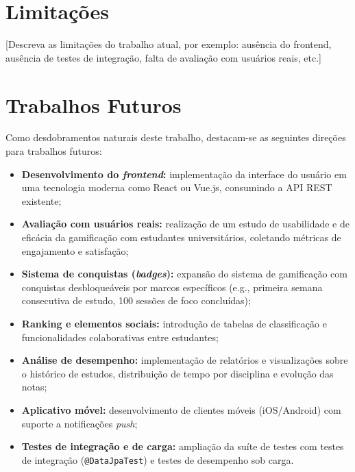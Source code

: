 \section{Limitações}
\label{sec:limitacoes}

[Descreva as limitações do trabalho atual, por exemplo: ausência do frontend,
ausência de testes de integração, falta de avaliação com usuários reais, etc.]

\section{Trabalhos Futuros}
\label{sec:trabalhos-futuros}

Como desdobramentos naturais deste trabalho, destacam-se as seguintes direções
para trabalhos futuros:

\begin{itemize}
  \item \textbf{Desenvolvimento do \textit{frontend}:} implementação da interface
        do usuário em uma tecnologia moderna como React ou Vue.js, consumindo a
        API REST existente;

  \item \textbf{Avaliação com usuários reais:} realização de um estudo de usabilidade
        e de eficácia da gamificação com estudantes universitários, coletando métricas
        de engajamento e satisfação;

  \item \textbf{Sistema de conquistas (\textit{badges}):} expansão do sistema de
        gamificação com conquistas desbloqueáveis por marcos específicos (e.g., primeira
        semana consecutiva de estudo, 100 sessões de foco concluídas);

  \item \textbf{Ranking e elementos sociais:} introdução de tabelas de classificação
        e funcionalidades colaborativas entre estudantes;

  \item \textbf{Análise de desempenho:} implementação de relatórios e visualizações
        sobre o histórico de estudos, distribuição de tempo por disciplina e evolução
        das notas;

  \item \textbf{Aplicativo móvel:} desenvolvimento de clientes móveis (iOS/Android)
        com suporte a notificações \textit{push};

  \item \textbf{Testes de integração e de carga:} ampliação da suíte de testes com
        testes de integração (\texttt{@DataJpaTest}) e testes de desempenho sob carga.
\end{itemize}
